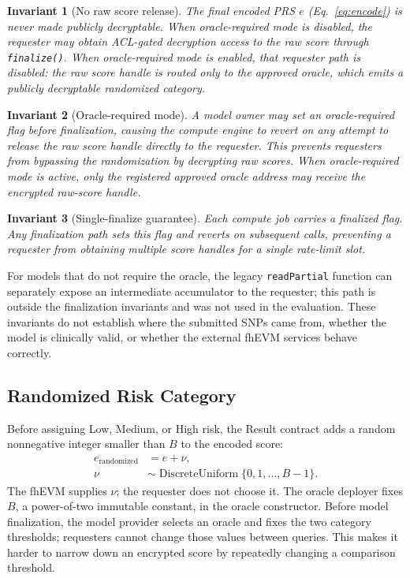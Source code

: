 \documentclass[10pt]{article}
\newtheorem{invariant}{Invariant}
\begin{document}
\begin{invariant}[No raw score release]
The final encoded PRS $e$ (Eq.~\ref{eq:encode}) is never made publicly
decryptable.  When oracle-required mode is disabled, the requester may obtain
ACL-gated decryption access to the raw score through \texttt{finalize()}.  When
oracle-required mode is enabled, that requester path is disabled: the raw score
handle is routed only to the approved oracle, which emits a publicly decryptable
randomized category.
\end{invariant}

\begin{invariant}[Oracle-required mode]
A model owner may set an oracle-required flag before finalization, causing the compute
engine to revert on any attempt to release the raw score handle directly to the
requester.  This prevents requesters from bypassing the randomization by decrypting raw
scores.  When oracle-required mode is active, only the registered approved oracle
address may receive the encrypted raw-score handle.
\end{invariant}

\begin{invariant}[Single-finalize guarantee]
Each compute job carries a finalized flag.  Any finalization path sets this flag
and reverts on subsequent calls, preventing a requester from obtaining multiple
score handles for a single rate-limit slot.
\end{invariant}

For models that do not require the oracle, the legacy \texttt{readPartial} function can
separately expose an intermediate accumulator to the requester; this path is outside the
finalization invariants and was not used in the evaluation.  These invariants do not
establish where the submitted SNPs came from, whether the model is clinically valid, or
whether the external fhEVM services behave correctly.

\subsection{Randomized Risk Category}

Before assigning Low, Medium, or High risk, the Result contract adds a random
nonnegative integer smaller than $B$ to the encoded score:
\begin{equation}
\begin{aligned}
e_{\mathrm{randomized}} &= e + \nu,\\
\nu &\sim \operatorname{DiscreteUniform}\{0,1,\ldots,B-1\}.
\end{aligned}
\end{equation}
The fhEVM supplies $\nu$; the requester does not choose it.  The oracle deployer fixes
$B$, a power-of-two immutable constant, in the oracle constructor.  Before model
finalization, the model provider selects an
oracle and fixes the two category thresholds; requesters cannot change those values between
queries.  This makes it harder to narrow down an encrypted score by repeatedly changing a
comparison threshold.
\end{document}

